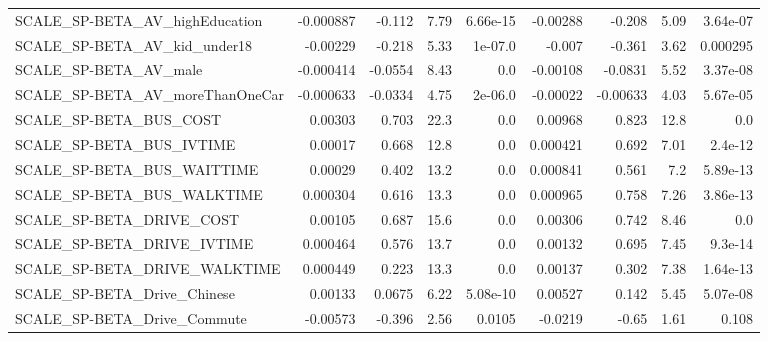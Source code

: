 \begin{tabular}{lrrrrrrrr}
SCALE\_SP-BETA\_AV\_highEducation                     &   -0.000887 &       -0.112 &     7.79 & 6.66e-15 &   -0.00288 &      -0.208 &         5.09 &      3.64e-07 \\
SCALE\_SP-BETA\_AV\_kid\_under18                       &    -0.00229 &       -0.218 &     5.33 &  1e-07.0 &     -0.007 &      -0.361 &         3.62 &      0.000295 \\
SCALE\_SP-BETA\_AV\_male                              &   -0.000414 &      -0.0554 &     8.43 &      0.0 &   -0.00108 &     -0.0831 &         5.52 &      3.37e-08 \\
SCALE\_SP-BETA\_AV\_moreThanOneCar                    &   -0.000633 &      -0.0334 &     4.75 &  2e-06.0 &   -0.00022 &    -0.00633 &         4.03 &      5.67e-05 \\
SCALE\_SP-BETA\_BUS\_COST                             &     0.00303 &        0.703 &     22.3 &      0.0 &    0.00968 &       0.823 &         12.8 &           0.0 \\
SCALE\_SP-BETA\_BUS\_IVTIME                           &     0.00017 &        0.668 &     12.8 &      0.0 &   0.000421 &       0.692 &         7.01 &       2.4e-12 \\
SCALE\_SP-BETA\_BUS\_WAITTIME                         &     0.00029 &        0.402 &     13.2 &      0.0 &   0.000841 &       0.561 &          7.2 &      5.89e-13 \\
SCALE\_SP-BETA\_BUS\_WALKTIME                         &    0.000304 &        0.616 &     13.3 &      0.0 &   0.000965 &       0.758 &         7.26 &      3.86e-13 \\
SCALE\_SP-BETA\_DRIVE\_COST                           &     0.00105 &        0.687 &     15.6 &      0.0 &    0.00306 &       0.742 &         8.46 &           0.0 \\
SCALE\_SP-BETA\_DRIVE\_IVTIME                         &    0.000464 &        0.576 &     13.7 &      0.0 &    0.00132 &       0.695 &         7.45 &       9.3e-14 \\
SCALE\_SP-BETA\_DRIVE\_WALKTIME                       &    0.000449 &        0.223 &     13.3 &      0.0 &    0.00137 &       0.302 &         7.38 &      1.64e-13 \\
SCALE\_SP-BETA\_Drive\_Chinese                        &     0.00133 &       0.0675 &     6.22 & 5.08e-10 &    0.00527 &       0.142 &         5.45 &      5.07e-08 \\
SCALE\_SP-BETA\_Drive\_Commute                        &    -0.00573 &       -0.396 &     2.56 &   0.0105 &    -0.0219 &       -0.65 &         1.61 &         0.108 \\

\end{tabular}
